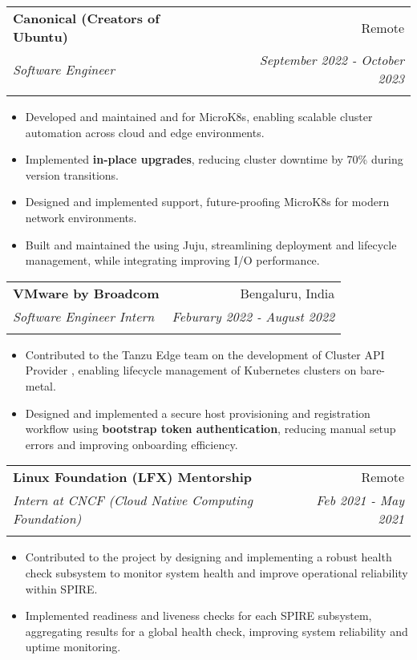 \documentclass[letterpaper,10pt]{article}
\makeatletter
\newcommand{\resumeItem}[2]{
  \item\small{
    \textbf{#1}{#2 \vspace{-2pt}}
  }
}
\newcommand{\resumeSubheading}[5]{
  \vspace{4pt}\item
    \begin{tabular*}{0.97\textwidth}[t]{l@{\extracolsep{\fill}}r}
      \textbf{#1} & #2 \\
      \textit{\small#3} & \textit{\small #4} \\
      \textit{\small#5}
    \end{tabular*}\vspace{-5pt}
}
\newcommand{\resumeItemListStart}{\begin{itemize}}
\newcommand{\resumeItemListEnd}{\end{itemize}\vspace{-5pt}}
\makeatother
\begin{document}
    \resumeSubheading
    {Canonical (Creators of Ubuntu)}{Remote}
    {Software Engineer} {September 2022 - October 2023}
    {\href{https://canonical.com/}{\color{MidnightBlue}{https://canonical.com/}}}
    \resumeItemListStart
    \resumeItem{}
    {Developed and maintained \href{https://github.com/canonical/cluster-api-control-plane-provider-microk8s/pulls?q=is\%3Apr+author\%3Asachinkumarsingh092}{\color{MidnightBlue}{Cluster API control-plane}} and \href{https://github.com/canonical/cluster-api-bootstrap-provider-microk8s/pulls?q=is\%3Apr+author\%3Asachinkumarsingh092}{\color{MidnightBlue}{bootstrap providers}} for MicroK8s, enabling scalable cluster automation across cloud and edge environments.}
    \resumeItem{}
    {Implemented \textbf{in-place upgrades}, reducing cluster downtime by 70\% during version transitions.}
    \resumeItem{}
    {Designed and implemented \href{https://github.com/canonical/microk8s/pulls?page=1&q=is\%3Apr+author\%3Asachinkumarsingh092}{\color{MidnightBlue}{dual-stack (IPv4 + IPv6)}} support, future-proofing MicroK8s for modern network environments.}
    \resumeItem{}
    {Built and maintained the \href{https://github.com/canonical/charm-microk8s/pulls?q=is\%3Apr+author\%3Asachinkumarsingh092}{\color{MidnightBlue}{MicroK8s charm}} using Juju, streamlining deployment and lifecycle management, while integrating \href{https://github.com/canonical/microk8s-core-addons/pulls?q=is\%3Apr+author\%3Asachinkumarsingh092+}{\color{MidnightBlue}{Ceph storage}} improving I/O performance.}
    \resumeItemListEnd


    \resumeSubheading
    {VMware by Broadcom}{Bengaluru, India}
    {Software Engineer Intern} {Feburary 2022 - August 2022}
    {\href{https://www.vmware.com/}{\color{MidnightBlue}{https://www.vmware.com/}}}
    \resumeItemListStart
    \resumeItem{}
    {Contributed to the Tanzu Edge team on the development of Cluster API Provider \href{https://github.com/vmware-tanzu/cluster-api-provider-bringyourownhost}{\color{MidnightBlue}{Bring Your Own Host}}, enabling lifecycle management of Kubernetes clusters on bare-metal.}
    \resumeItem{}
    {Designed and implemented a secure host provisioning and registration workflow using \textbf{bootstrap token authentication}, reducing manual setup errors and improving onboarding efficiency.}
    \resumeItemListEnd


     \resumeSubheading
      {Linux Foundation (LFX) Mentorship}{Remote}
      {Intern at CNCF (Cloud Native Computing Foundation)} {Feb 2021 - May 2021}
      {\href{https://mentorship.lfx.linuxfoundation.org/project/5c4a200d-b81e-4332-bea6-50120fbf28b4}{\color{MidnightBlue}{Mentorship Page}}}
      \resumeItemListStart
	\resumeItem{}
	{Contributed to the {\href{https://spiffe.io/}{\color{MidnightBlue}{SPIFFE/SPIRE}}} project by designing and implementing a robust health check subsystem to monitor system health and improve operational reliability within SPIRE.}
	\resumeItem{}
	{Implemented readiness and liveness checks for each SPIRE subsystem, aggregating results for a global health check, improving system reliability and uptime monitoring.}
     \resumeItemListEnd
\end{document}
